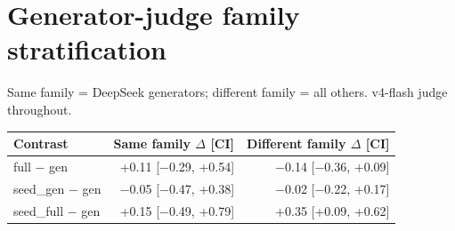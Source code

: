 \documentclass{article}
\begin{document}
\section{Generator-judge family stratification}
\label{app:family}

Same family = DeepSeek generators; different family = all others.
v4-flash judge throughout.

\begin{table}[h]
  \centering
  \small
  \begin{tabular}{lrr}
    \toprule
    Contrast & Same family $\Delta$ [CI] & Different family $\Delta$ [CI] \\
    \midrule
    full $-$ gen & +0.11 [$-$0.29, +0.54] & $-$0.14 [$-$0.36, +0.09] \\
    seed\_gen $-$ gen & $-$0.05 [$-$0.47, +0.38] & $-$0.02 [$-$0.22, +0.17] \\
    seed\_full $-$ gen & +0.15 [$-$0.49, +0.79] & +0.35 [+0.09, +0.62] \\
    \bottomrule
  \end{tabular}
\end{table}

\newpage

\end{document}

